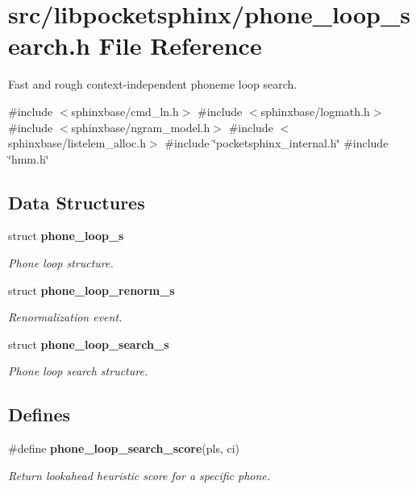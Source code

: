 \section{src/libpocketsphinx/phone\-\_\-loop\-\_\-search.h \-File \-Reference}
\label{phone__loop__search_8h}


\-Fast and rough context-\/independent phoneme loop search.  


{\ttfamily \#include $<$sphinxbase/cmd\-\_\-ln.\-h$>$}\*
{\ttfamily \#include $<$sphinxbase/logmath.\-h$>$}\*
{\ttfamily \#include $<$sphinxbase/ngram\-\_\-model.\-h$>$}\*
{\ttfamily \#include $<$sphinxbase/listelem\-\_\-alloc.\-h$>$}\*
{\ttfamily \#include \char`\"{}pocketsphinx\-\_\-internal.\-h\char`\"{}}\*
{\ttfamily \#include \char`\"{}hmm.\-h\char`\"{}}\*
\subsection*{\-Data \-Structures}
\begin{DoxyCompactItemize}
\item 
struct {\bf phone\-\_\-loop\-\_\-s}
\begin{DoxyCompactList}\small\item\em \-Phone loop structure. \end{DoxyCompactList}\item 
struct {\bf phone\-\_\-loop\-\_\-renorm\-\_\-s}
\begin{DoxyCompactList}\small\item\em \-Renormalization event. \end{DoxyCompactList}\item 
struct {\bf phone\-\_\-loop\-\_\-search\-\_\-s}
\begin{DoxyCompactList}\small\item\em \-Phone loop search structure. \end{DoxyCompactList}\end{DoxyCompactItemize}
\subsection*{\-Defines}
\begin{DoxyCompactItemize}
\item 
\#define {\bf phone\-\_\-loop\-\_\-search\-\_\-score}(pls, ci)
\begin{DoxyCompactList}\small\item\em \-Return lookahead heuristic score for a specific phone. \end{DoxyCompactList}\end{DoxyCompactItemize}

